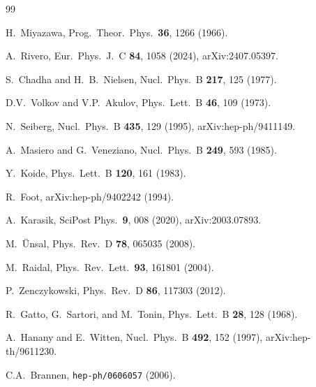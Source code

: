 \documentclass[aps,prd,twocolumn,showpacs,preprintnumbers,superscriptaddress]{revtex4-2}
\begin{document}
\begin{thebibliography}{99}

  H.~Miyazawa,
  Prog.\ Theor.\ Phys.\ \textbf{36}, 1266 (1966).

  A.~Rivero,
  Eur.\ Phys.\ J.\ C \textbf{84}, 1058 (2024),
  arXiv:2407.05397.

  S.~Chadha and H.~B.~Nielsen,
  Nucl.\ Phys.\ B \textbf{217}, 125 (1977).

  D.V.~Volkov and V.P.~Akulov,
  Phys.\ Lett.\ B \textbf{46}, 109 (1973).

  N.~Seiberg,
  Nucl.\ Phys.\ B \textbf{435}, 129 (1995),
  arXiv:hep-ph/9411149.

  A.~Masiero and G.~Veneziano,
  Nucl.\ Phys.\ B \textbf{249}, 593 (1985).

  Y.~Koide,
  Phys.\ Lett.\ B \textbf{120}, 161 (1983).

  R.~Foot,
  arXiv:hep-ph/9402242 (1994).

  A.~Karasik,
  SciPost Phys.\ \textbf{9}, 008 (2020),
  arXiv:2003.07893.

  M.~\"Unsal,
  Phys.\ Rev.\ D \textbf{78}, 065035 (2008).

  M.~Raidal,
  Phys.\ Rev.\ Lett.\ \textbf{93}, 161801 (2004).

  P.~Zenczykowski,
  Phys.\ Rev.\ D \textbf{86}, 117303 (2012).

  R.~Gatto, G.~Sartori, and M.~Tonin,
  Phys.\ Lett.\ B \textbf{28}, 128 (1968).

  A.~Hanany and E.~Witten,
  Nucl.\ Phys.\ B \textbf{492}, 152 (1997),
  arXiv:hep-th/9611230.

  C.A.~Brannen,
  \texttt{hep-ph/0606057} (2006).

\end{thebibliography}
\end{document}
